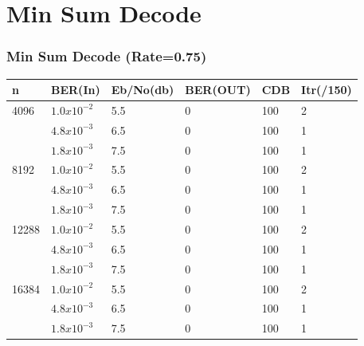 \documentclass[xcolor=dvipsname]
{beamer}
\begin{document}
\section{Min Sum Decode}
\begin{frame}[t] 
\frametitle{Min Sum Decode (Rate=0.75)}
\begin{table}[]
\centering
\begin{tabular}{|l|l|l|l|l|l|}
\hline
n     & BER(In) 			& Eb/No(db) & BER(OUT) & CDB  & Itr(/150) \\ \hline
4096  & $1.0x10^{-2}$       & 5.5   & 0   & 100 & 2         \\ 
      &	$4.8x10^{-3}$		& 6.5   & 0   & 100 & 1         \\
      &	$1.8x10^{-3}$		& 7.5   & 0   & 100 & 1         \\ \hline
8192  &	$1.0x10^{-2}$    	& 5.5   & 0   & 100 & 2         \\ 
      &	$4.8x10^{-3}$		& 6.5   & 0   & 100 & 1         \\
      &	$1.8x10^{-3}$		& 7.5   & 0   & 100 & 1         \\ \hline
12288 &	$1.0x10^{-2}$		& 5.5   & 0   & 100 & 2         \\ 
      &	$4.8x10^{-3}$		& 6.5   & 0   & 100 & 1         \\ 
      &	$1.8x10^{-3}$		& 7.5   & 0   & 100 & 1         \\ \hline
16384 &	$1.0x10^{-2}$		& 5.5   & 0   & 100 & 2         \\ 
      &	$4.8x10^{-3}$		& 6.5   & 0   & 100 & 1         \\ 
      &	$1.8x10^{-3}$		& 7.5   & 0   & 100 & 1         \\ \hline
\end{tabular}
\end{table}
\end{frame}
\end{document}
